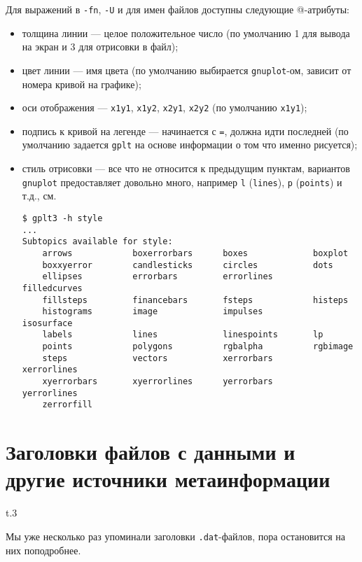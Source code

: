 \documentclass[12pt]{article}
\def\gplt{{\tt gplt}}
\def\gnuplot{{\tt gnuplot}}
\begin{document}
Для выражений в \verb'-fn', \verb'-U' и для имен файлов доступны следующие @-атрибуты:
\begin{itemize}
\item толщина линии --- целое положительное число (по умолчанию 1 для вывода на экран и 3 для отрисовки в файл);
\item цвет линии --- имя цвета (по умолчанию выбирается \gnuplot-ом, зависит от номера кривой на графике);
\item оси отображения --- \verb'x1y1', \verb'x1y2', \verb'x2y1', \verb'x2y2' (по умолчанию \verb'x1y1');
\item подпись к кривой на легенде --- начинается с \verb'=', должна идти последней (по умолчанию задается \gplt{} на основе информации о том что именно рисуется);
\item стиль отрисовки --- все что не относится к предыдущим пунктам, вариантов \gnuplot{} предоставляет довольно много, например \verb'l' (\verb'lines'),
  \verb'p' (\verb'points') и т.д., см.
\begin{verbatim}
$ gplt3 -h style
...
Subtopics available for style:
    arrows            boxerrorbars      boxes             boxplot
    boxxyerror        candlesticks      circles           dots
    ellipses          errorbars         errorlines        filledcurves
    fillsteps         financebars       fsteps            histeps
    histograms        image             impulses          isosurface
    labels            lines             linespoints       lp
    points            polygons          rgbalpha          rgbimage
    steps             vectors           xerrorbars        xerrorlines
    xyerrorbars       xyerrorlines      yerrorbars        yerrorlines
    zerrorfill
\end{verbatim}
\end{itemize}

\section{Заголовки файлов с данными и другие источники метаинформации}
\begin{wrapfigure}[5]{t}{.3\textwidth}
  \vphantom{.}
  \vspace{-1.2cm}

\end{wrapfigure}
Мы уже несколько раз упоминали заголовки \verb'.dat'-файлов, пора остановится на них поподробнее.
\end{document}

